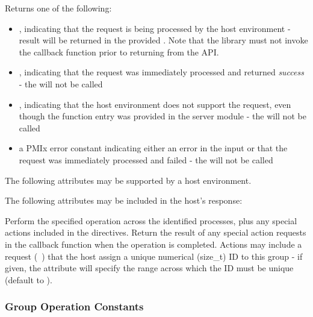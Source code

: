 Returns one of the following:

\begin{itemize}
    \item {}, indicating that the request is being processed by the host environment - result will be returned in the provided . Note that the library must not invoke the callback function prior to returning from the \ac{API}.
    \item {}, indicating that the request was immediately processed and returned \textit{success} - the  will not be called
    \item {}, indicating that the host environment does not support the request, even though the function entry was provided in the server module - the  will not be called
    \item a PMIx error constant indicating either an error in the input or that the request was immediately processed and failed - the  will not be called
\end{itemize}

\optattrstart
The following attributes may be supported by a host environment.



The following attributes may be included in the host's response:


\optattrend

\descr

Perform the specified operation across the identified processes, plus any special actions included in the directives. Return the result of any special action requests in the callback function when the operation is completed. Actions may include a request (~) that the host assign a unique numerical (size_t) ID to this group - if given, the  attribute will specify the range across which the ID must be unique (default to ).

\subsubsection{Group Operation Constants}

